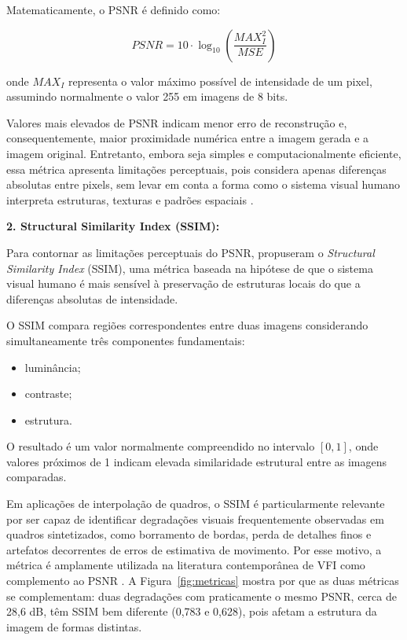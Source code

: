 \documentclass[
    12pt,                %
    openright,           %
    oneside,             %
    a4paper,             %
    english,             %
    brazil               %
]{abntex2}
\begin{document}
Matematicamente, o PSNR é definido como:

\begin{equation}
    PSNR = 10 \cdot \log_{10}
    \left(
    \frac{MAX_I^2}{MSE}
    \right)
\end{equation}

onde $MAX_I$ representa o valor máximo possível de intensidade de um pixel, assumindo normalmente o valor 255 em imagens de 8 bits.

Valores mais elevados de PSNR indicam menor erro de reconstrução e, consequentemente, maior proximidade numérica entre a imagem gerada e a imagem original. Entretanto, embora seja simples e computacionalmente eficiente, essa métrica apresenta limitações perceptuais, pois considera apenas diferenças absolutas entre pixels, sem levar em conta a forma como o sistema visual humano interpreta estruturas, texturas e padrões espaciais \cite{Hore2010}.

\vspace{0.3cm}

\textbf{2. Structural Similarity Index (SSIM):}

Para contornar as limitações perceptuais do PSNR,  propuseram o \textit{Structural Similarity Index} (SSIM), uma métrica baseada na hipótese de que o sistema visual humano é mais sensível à preservação de estruturas locais do que a diferenças absolutas de intensidade.

O SSIM compara regiões correspondentes entre duas imagens considerando simultaneamente três componentes fundamentais:

\begin{itemize}
    \item luminância;
    \item contraste;
    \item estrutura.
\end{itemize}

O resultado é um valor normalmente compreendido no intervalo $[0,1]$, onde valores próximos de 1 indicam elevada similaridade estrutural entre as imagens comparadas.

Em aplicações de interpolação de quadros, o SSIM é particularmente relevante por ser capaz de identificar degradações visuais frequentemente observadas em quadros sintetizados, como borramento de bordas, perda de detalhes finos e artefatos decorrentes de erros de estimativa de movimento. Por esse motivo, a métrica é amplamente utilizada na literatura contemporânea de VFI como complemento ao PSNR \cite{Niklaus2017,Niklaus2021}. A Figura~\ref{fig:metricas} mostra por que as duas métricas se complementam: duas degradações com praticamente o mesmo PSNR, cerca de 28,6 dB, têm SSIM bem diferente (0,783 e 0,628), pois afetam a estrutura da imagem de formas distintas.
\end{document}

